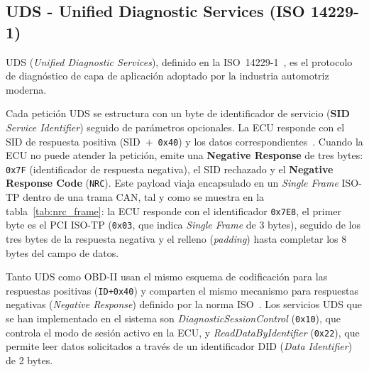 % 


\subsection{UDS - Unified Diagnostic Services (ISO 14229-1)}
\label{sec:proto_uds}

UDS (\textit{Unified Diagnostic Services}), definido en la ISO~14229-1~\cite{ISO14229-1:2020}, es el protocolo de diagnóstico de capa de aplicación adoptado por la industria automotriz moderna.

Cada petición UDS se estructura con un byte de identificador de servicio (\textbf{SID} \textit{Service Identifier}) seguido de parámetros opcionales. La ECU responde con el SID de respuesta positiva (SID~$+$~\texttt{0x40}) y los datos correspondientes~\cite{ISO14229-1:2020}. Cuando la ECU no puede atender la petición, emite una \textbf{Negative Response} de tres bytes: \texttt{0x7F} (identificador de respuesta negativa), el SID rechazado y el \textbf{Negative Response Code} (\texttt{NRC}). Este payload viaja encapsulado en un \textit{Single Frame} ISO-TP dentro de una trama CAN, tal y como se muestra en la tabla~\ref{tab:nrc_frame}: la ECU responde con el identificador \texttt{0x7E8}, el primer byte es el PCI ISO-TP (\texttt{0x03}, que indica \textit{Single Frame} de 3 bytes), seguido de los tres bytes de la respuesta negativa y el relleno (\textit{padding}) hasta completar los 8 bytes del campo de datos.

\begin{table}[!htbp]
\caption{Trama CAN completa recibida en una respuesta negativa UDS/OBD-II: encapsulado ISO-TP (\textit{Single Frame}) del payload \textit{Negative Response} según ISO~14229-1~\cite{ISO14229-1:2020} e ISO~15765-2~\cite{ISO15765-2:2016}.}
\label{tab:nrc_frame}

\end{table}

Tanto UDS como OBD-II usan el mismo esquema de codificación para las respuestas positivas (\texttt{ID+0x40}) y comparten el mismo mecanismo para respuestas negativas (\textit{Negative Response}) definido por la norma ISO~\cite{ISO14229-1:2020}. Los servicios UDS que se han implementado en el sistema son \textit{DiagnosticSessionControl} (\texttt{0x10}), que controla el modo de sesión activo en la ECU, y \textit{ReadDataByIdentifier} (\texttt{0x22}), que permite leer datos solicitados a través de un identificador DID (\textit{Data Identifier}) de 2 bytes.

